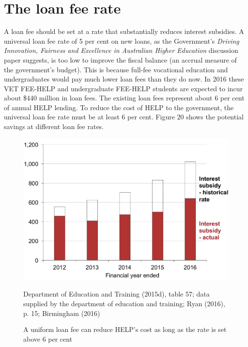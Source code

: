 \documentclass[embargoed]{grattan}
\begin{document}
\section{The loan fee rate}\label{sec:the-loan-fee-rate}

A loan fee should be set at a rate that substantially reduces interest subsidies.
A universal loan fee rate of 5 per cent on new loans, as the Government's \emph{Driving Innovation, Fairness and Excellence in Australian Higher Education} discussion paper suggests, is too low to improve the fiscal balance (an accrual measure of the government's budget).
This is because full-fee vocational education and undergraduates would pay much lower loan fees than they do now.
In 2016 these VET FEE-HELP and undergraduate FEE-HELP students are expected to incur about \$440 million in loan fees.
The existing loan fees represent about 6 per cent of annual HELP lending.
To reduce the cost of HELP to the government, the universal loan fee rate must be at least 6 per cent.
Figure 20 shows the potential savings at different loan fee rates.

\begin{figure}
\caption{A uniform loan fee can reduce HELP's cost as long as the rate is set above 6 per cent}\label{fig:fig20-uniform-loan-fee-can-reduce-HELPs-cost-as-long-as-the-rate-is-set-above-6pc}

\includegraphics[page=20]{atlas/Chartpack.pdf}

%
{Department of Education and Training (2015d), table 57; data supplied by the department of education and training; Ryan (2016), p. 15; Birmingham (2016)}
\end{figure}
\end{document}
